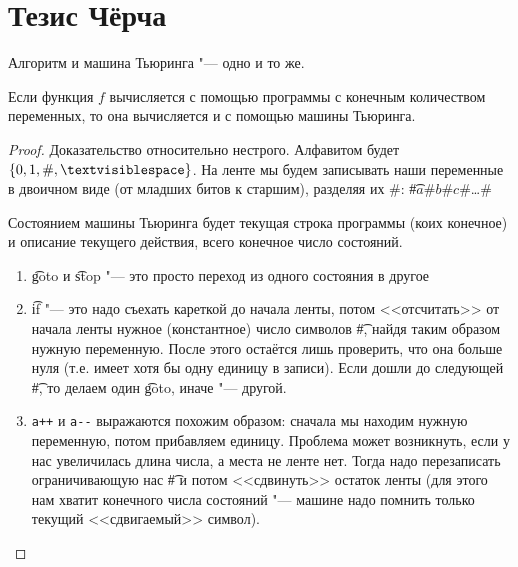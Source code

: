 \section{Тезис Чёрча}

Алгоритм и машина Тьюринга "--- одно и то же.

\begin{theorem}
	Если функция $f$ вычисляется с помощью программы с конечным количеством переменных, то она вычисляется и с помощью машины Тьюринга.
\end{theorem}
\begin{proof}
	Доказательство относительно нестрого.
	Алфавитом будет $\{0, 1, \#, \textvisiblespace\}$.
	На ленте мы будем записывать наши переменные в двоичном виде (от младших битов к старшим), разделяя их $\#$:
	\t{\#$a$\#$b$\#$c$\#\dots\#}

	Состоянием машины Тьюринга будет текущая строка программы (коих конечное) и описание текущего действия, всего конечное число состояний.
	\begin{enumerate}
		\item \t{goto} и \t{stop} "--- это просто переход из одного состояния в другое
		\item
			\t{if} "--- это надо съехать кареткой до начала ленты, потом <<отсчитать>> от начала ленты нужное (константное) число символов \t{\#}, найдя таким образом нужную переменную.
			После этого остаётся лишь проверить, что она больше нуля (т.е. имеет хотя бы одну единицу в записи).
			Если дошли до следующей \t{\#}, то делаем один \t{goto}, иначе "--- другой.
		\item
			\verb'a++' и \verb'a--' выражаются похожим образом: сначала мы находим нужную переменную, потом прибавляем единицу.
			Проблема может возникнуть, если у нас увеличилась длина числа, а места не ленте нет.
			Тогда надо перезаписать ограничивающую нас \t{\#} и потом <<сдвинуть>> остаток ленты (для этого нам хватит конечного числа состояний "--- машине надо помнить только текущий <<сдвигаемый>> символ).
	\end{enumerate}
\end{proof}

